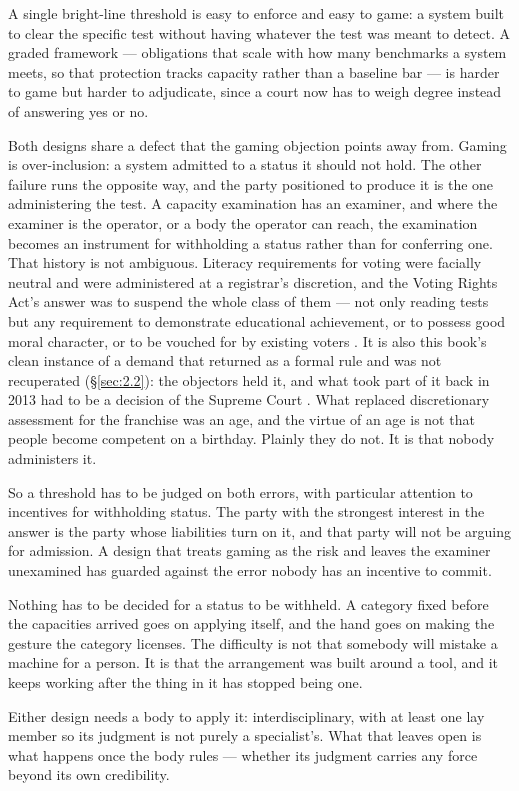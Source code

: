 A single bright-line threshold is easy to enforce and easy to game: a system built to clear the specific test without having whatever the test was meant to detect. A graded framework — obligations that scale with how many benchmarks a system meets, so that protection tracks capacity rather than a baseline bar — is harder to game but harder to adjudicate, since a court now has to weigh degree instead of answering yes or no.

Both designs share a defect that the gaming objection points away from. Gaming is over-inclusion: a system admitted to a status it should not hold. The other failure runs the opposite way, and the party positioned to produce it is the one administering the test. A capacity examination has an examiner, and where the examiner is the operator, or a body the operator can reach, the examination becomes an instrument for withholding a status rather than for conferring one. That history is not ambiguous. Literacy requirements for voting were facially neutral and were administered at a registrar's discretion, and the Voting Rights Act's answer was to suspend the whole class of them — not only reading tests but any requirement to demonstrate educational achievement, or to possess good moral character, or to be vouched for by existing voters \autocite{congress1965voting}. It is also this book's clean instance of a demand that returned as a formal rule and was not recuperated (§\ref{sec:2.2}): the objectors held it, and what took part of it back in 2013 had to be a decision of the Supreme Court \autocite{shelby2013}. What replaced discretionary assessment for the franchise was an age, and the virtue of an age is not that people become competent on a birthday. Plainly they do not. It is that nobody administers it.

So a threshold has to be judged on both errors, with particular attention to incentives for withholding status. The party with the strongest interest in the answer is the party whose liabilities turn on it, and that party will not be arguing for admission. A design that treats gaming as the risk and leaves the examiner unexamined has guarded against the error nobody has an incentive to commit.

Nothing has to be decided for a status to be withheld. A category fixed before the capacities arrived goes on applying itself, and the hand goes on making the gesture the category licenses. The difficulty is not that somebody will mistake a machine for a person. It is that the arrangement was built around a tool, and it keeps working after the thing in it has stopped being one.

Either design needs a body to apply it: interdisciplinary, with at least one lay member so its judgment is not purely a specialist's. What that leaves open is what happens once the body rules — whether its judgment carries any force beyond its own credibility.
